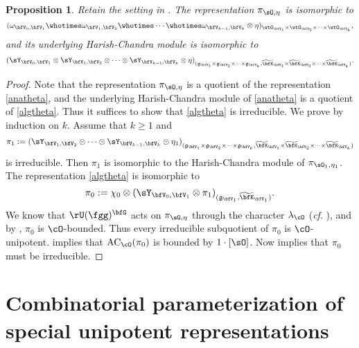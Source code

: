\documentclass[12pt,a4paper]{amsart}
\newcommand{\AC}{\mathrm{AC}}
\newcommand{\g}{\mathfrak g}
\numberwithin{equation}{section}
\newtheorem{prop}[thm]{Proposition}
\theoremstyle{remark}
\def\wtbfK{\widetilde{\bfK}}
\begin{document}
\begin{prop}Retain the setting in .
  The representation $ \pi_{\sO, \eta}$ is isomorphic to
  \begin{equation}\label{anatheta}
    (\omega_{\bfV_0, \bfV_1}\whotimes \omega_{\bfV_1, \bfV_2} \whotimes \cdots
    \whotimes \omega_{\bfV_{k-1},\bfV_k}\otimes \eta)_{
      \wtG_{\bfV_1}\times \wtG_{\bfV_2}\times \cdots \times  \wtG_{\bfV_k}},
  \end{equation}
  and its underlying Harish-Chandra module is isomorphic to
  \begin{equation}\label{algtheta}
    (\sY_{\bfV_0, \bfV_1} \otimes \sY_{\bfV_1, \bfV_2} \otimes \cdots
    \otimes \sY_{\bfV_{k-1},\bfV_k}\otimes \eta )_{
      (\g_{\bfV_1}\times \g_{\bfV_2}\times \cdots \times \g_{\bfV_k},
      \wtbfK_{\bfV_1}\times  \wtbfK_{\bfV_2}\times \cdots \times \wtbfK_{\bfV_k})}.
  \end{equation}
\end{prop}
\begin{proof}
  Note that the representation $ \pi_{\sO, \eta}$ is a quotient of the
  representation \eqref{anatheta}, and the underlying Harish-Chandra module of
  \eqref{anatheta} is a quotient of \eqref{algtheta}. Thus it suffices to show
  that \eqref{algtheta} is irreducible.  We prove by induction on $k$. Assume that $k\geq 1$ and
  \[
    \pi_1:= (\sY_{\bfV_1, \bfV_2} \otimes \cdots \otimes
    \sY_{\bfV_{k-1},\bfV_k}\otimes \eta_1)_{(\g_{\bfV_1}\times \g_{\bfV_2}\times
      \cdots \times \g_{\bfV_k}, \widetilde{\bfK}_{\bfV_1}\times
      \widetilde{\bfK}_{\bfV_2}\times \cdots \times \widetilde{\bfK}_{\bfV_k})}
  \]
  is irreducible. Then $\pi_1$ is isomorphic to the Harish-Chandra module of
  $ \pi_{\sO_1, \eta_1}$.  The representation \eqref{algtheta} is isomorphic to
  \[
    \pi_0:= \chi_0 \otimes (\sY_{\bfV_0, \bfV_1} \otimes \pi_1)_{(\g_{\bfV_1},
      \widetilde{\bfK}_{\bfV_1})}.
  \]
  We know that  $\rU(\fgg)^{\bfG} $ acts on $\pi_{\sO, \eta}$ through the character $\lambda_{\cO}$ (\emph{cf}. \cite{PrzInf}), and by
  , $\pi_0$ is $\cO$-bounded.  Thus every irreducible
  subquotient of $\pi_0$ is $\cO$-unipotent.  
  implies that $\AC_{\cO}(\pi_0)$ is bounded by $1\cdot [\sO]$. Now
   implies that $\pi_0$ must be irreducible.
\end{proof}


\appendix

\section{Combinatorial parameterization of special unipotent representations}
\end{document}
